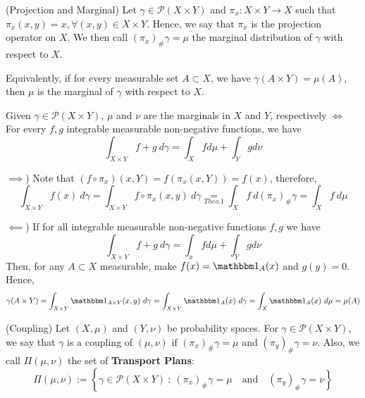 \begin{definition}(Projection and Marginal)
  Let $\gamma \in \mathcal P(X\times Y)$ and $\pi_x: X \times Y \to X$
  such that $\pi_x(x,y) = x, \forall (x,y) \in X\times Y$. Hence,
  we say that $\pi_x$ is the projection operator on $X$. We then call
  $(\pi_x)_\#\gamma = \mu$ the marginal distribution of $\gamma$ with
  respect to $X$.

  Equivalently, if for every measurable set $A \subset X$, we have
  $\gamma(A\times Y) = \mu(A)$, then $\mu$ is the marginal of $\gamma$
  with respect to $X$.

  \begin{corollary}
    \label{cor_marginals}
    Given $\gamma \in \mathcal P(X \times Y)$, $\mu$ and $\nu$ are the
    marginals in $X$ and $Y$, respectively $\iff$ For every $f,g$
    integrable measurable non-negative functions, we have
    $$
      \int_{X\times Y} f+g \ d\gamma = \int_X f d\mu + \int_Y g d\nu
    $$
  \end{corollary}
  \begin{prf}
    $\implies$) Note that $(f \circ \pi_x)(x,Y) = f(\pi_x(x,Y))=f(x)$,
    therefore,
    $$
      \int_{X\times Y} f(x) \ d\gamma = \int_{X \times Y} f \circ
      \pi_x(x,y) \ d\gamma \underset{Theo. 1}{=} \int_X f \ d
      (\pi_x)_\# \gamma = \int_X f \ d\mu
    $$

    $\impliedby$) If for all
    integrable measurable non-negative functions $f,g$ we have
    $$
      \int_{X\times Y} f+g \ d\gamma = \int_x f d\mu + \int_Y g d\nu
    $$
    Then, for any $A \subset X$ measurable, make $f(x) = \mathbbm 1_A(x)$
    and $g(y) =0$. Hence,
    $$
      \gamma(A\times Y) =
      \int_{X \times Y} \mathbbm 1_{A \times Y}(x,y) \ d \gamma =
      \int_{X \times Y} \mathbbm 1_A(x) \ d \gamma =
      \int_{X} \mathbbm 1_A(x) \ d \mu = \mu(A)
    $$

  \end{prf}
\end{definition}

\begin{definition} (Coupling)
  Let $(X,\mu)$ and $(Y,\nu)$ be probability spaces. For
  $\gamma \in \mathcal{P}(X\times Y)$, we say that $\gamma$
  is a coupling of $(\mu,\nu)$ if $(\pi_x)_\# \gamma = \mu$
  and $(\pi_y)_\# \gamma = \nu$. Also, we call $\Pi(\mu,\nu)$
  the set of \textbf{Transport Plans}:
  \begin{equation}
    \Pi(\mu,\nu) :=
    \left \{
    \gamma \in \mathcal{P}(X \times Y) \ :
    \ (\pi_x)_\# \gamma = \mu \quad
    \text{and} \quad
    (\pi_y)_\# \gamma = \nu
    \right \}
  \end{equation}
\end{definition}

